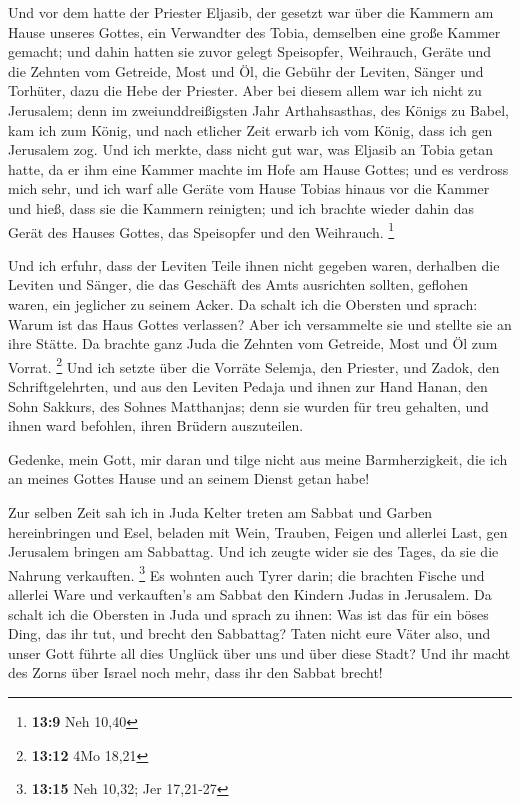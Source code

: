  Und vor dem hatte der Priester Eljasib, der gesetzt war
über die Kammern am Hause unseres Gottes, ein Verwandter des Tobia,
demselben eine große Kammer gemacht;  und dahin hatten sie
zuvor gelegt Speisopfer, Weihrauch, Geräte und die Zehnten vom Getreide,
Most und Öl, die Gebühr der Leviten, Sänger und Torhüter, dazu die Hebe
der Priester.  Aber bei diesem allem war ich nicht zu
Jerusalem; denn im zweiunddreißigsten Jahr Arthahsasthas, des Königs zu
Babel, kam ich zum König, und nach etlicher Zeit erwarb ich vom König,
 dass ich gen Jerusalem zog. Und ich merkte, dass nicht gut
war, was Eljasib an Tobia getan hatte, da er ihm eine Kammer machte im
Hofe am Hause Gottes;  und es verdross mich sehr, und ich
warf alle Geräte vom Hause Tobias hinaus vor die Kammer  und
hieß, dass sie die Kammern reinigten; und ich brachte wieder dahin das
Gerät des Hauses Gottes, das Speisopfer und den Weihrauch. \footnote{\textbf{13:9}
  Neh 10,40}

 Und ich erfuhr, dass der Leviten Teile ihnen nicht gegeben
waren, derhalben die Leviten und Sänger, die das Geschäft des Amts
ausrichten sollten, geflohen waren, ein jeglicher zu seinem Acker.
 Da schalt ich die Obersten und sprach: Warum ist das Haus
Gottes verlassen? Aber ich versammelte sie und stellte sie an ihre
Stätte.  Da brachte ganz Juda die Zehnten vom Getreide,
Most und Öl zum Vorrat. \footnote{\textbf{13:12} 4Mo 18,21}
 Und ich setzte über die Vorräte Selemja, den Priester, und
Zadok, den Schriftgelehrten, und aus den Leviten Pedaja und ihnen zur
Hand Hanan, den Sohn Sakkurs, des Sohnes Matthanjas; denn sie wurden für
treu gehalten, und ihnen ward befohlen, ihren Brüdern auszuteilen.

 Gedenke, mein Gott, mir daran und tilge nicht aus meine
Barmherzigkeit, die ich an meines Gottes Hause und an seinem Dienst
getan habe!

 Zur selben Zeit sah ich in Juda Kelter treten am Sabbat
und Garben hereinbringen und Esel, beladen mit Wein, Trauben, Feigen und
allerlei Last, gen Jerusalem bringen am Sabbattag. Und ich zeugte wider
sie des Tages, da sie die Nahrung verkauften. \footnote{\textbf{13:15}
  Neh 10,32; Jer 17,21-27}  Es wohnten auch Tyrer darin;
die brachten Fische und allerlei Ware und verkauften's am Sabbat den
Kindern Judas in Jerusalem.  Da schalt ich die Obersten in
Juda und sprach zu ihnen: Was ist das für ein böses Ding, das ihr tut,
und brecht den Sabbattag?  Taten nicht eure Väter also, und
unser Gott führte all dies Unglück über uns und über diese Stadt? Und
ihr macht des Zorns über Israel noch mehr, dass ihr den Sabbat brecht!

